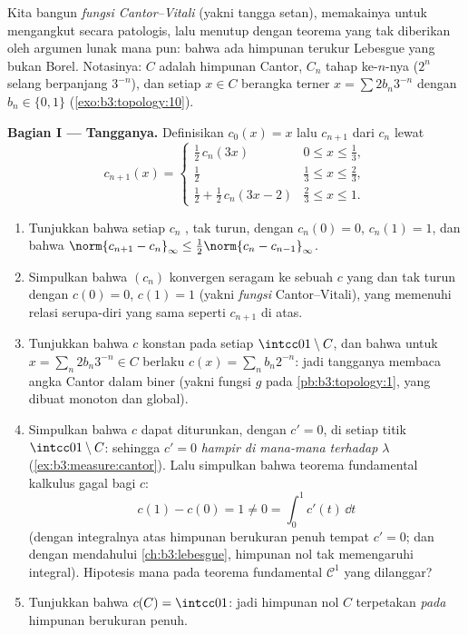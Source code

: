 \begin{problem}
\label{pb:b3:measure:1}
Kita bangun \emph{fungsi Cantor--Vitali} (yakni tangga
setan), memakainya untuk mengangkut  secara patologis, lalu
menutup dengan teorema yang tak diberikan oleh argumen lunak mana pun: bahwa
ada himpunan terukur Lebesgue yang bukan Borel. Notasinya:
$C$ adalah himpunan Cantor, $C_n$ tahap ke-$n$-nya ($2^n$ selang
berpanjang $3^{-n}$), dan setiap $x \in C$ berangka terner
$x = \sum 2b_n3^{-n}$ dengan $b_n \in \{0,1\}$
(\cref{exo:b3:topology:10}).

\medskip
\noindent\textbf{Bagian I --- Tangganya.} Definisikan $c_0(x) = x$
lalu $c_{n+1}$ dari $c_n$ lewat
\[
c_{n+1}(x) = \begin{cases}
\tfrac12\,c_n(3x) & 0 \leq x \leq \tfrac13,\\[2pt]
\tfrac12 & \tfrac13 \leq x \leq \tfrac23,\\[2pt]
\tfrac12 + \tfrac12\,c_n(3x - 2) & \tfrac23 \leq x \leq 1.
\end{cases}
\]
\begin{enumerate}
  \item Tunjukkan bahwa setiap $c_n$ , tak turun, dengan
        $c_n(0) = 0$, $c_n(1) = 1$, dan bahwa
        $\norm{c_{n+1} - c_n}_\infty \leq
        \tfrac12\norm{c_n - c_{n-1}}_\infty$.
  \item Simpulkan bahwa $(c_n)$ konvergen seragam ke sebuah $c$ yang
         dan tak turun dengan $c(0) = 0$, $c(1) = 1$
        (yakni \emph{fungsi} Cantor--Vitali), yang memenuhi
        relasi serupa-diri yang sama seperti $c_{n+1}$ di atas.
  \item Tunjukkan bahwa $c$ konstan pada setiap 
        $\intcc01\setminus C$, dan bahwa untuk $x = \sum_n
        2b_n3^{-n} \in C$ berlaku $c(x) = \sum_n b_n2^{-n}$: jadi
        tangganya membaca angka Cantor dalam biner
        (yakni fungsi $g$ pada \cref{pb:b3:topology:1}, yang dibuat monoton
        dan global).
  \item Simpulkan bahwa $c$ dapat diturunkan, dengan $c' = 0$, di
        setiap titik $\intcc01\setminus C$: sehingga $c' = 0$
        \emph{hampir di mana-mana terhadap $\lambda$}
        (\cref{ex:b3:measure:cantor}). Lalu simpulkan bahwa
        teorema fundamental kalkulus gagal bagi $c$:
        \[
        c(1) - c(0) = 1 \neq 0 = \int_0^1 c'(t)\,\dd t
        \]
        (dengan integralnya atas himpunan berukuran penuh tempat
        $c' = 0$; dan dengan mendahului \cref{ch:b3:lebesgue}, himpunan nol
        tak memengaruhi integral). Hipotesis mana pada
        teorema fundamental $\mathcal C^1$ yang dilanggar?
  \item Tunjukkan bahwa $c(C) = \intcc01$: jadi himpunan nol $C$ terpetakan
        \emph{pada} himpunan berukuran penuh.
\end{enumerate}


\end{problem}
